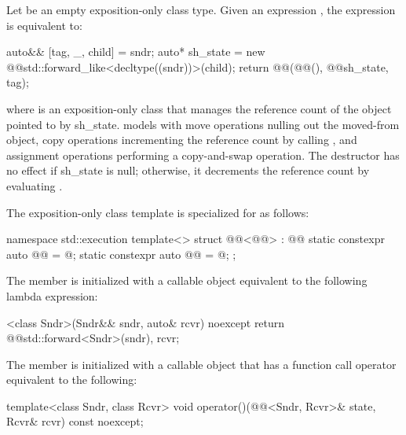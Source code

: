 \pnum
Let  be an empty exposition-only class type.
Given an expression ,
the expression  is equivalent to:
\begin{codeblock}
auto&& [tag, _, child] = sndr;
auto* sh_state = new @@{std::forward_like<decltype((sndr))>(child)};
return @@(@@(), @@{sh_state, tag});
\end{codeblock}
where  is an exposition-only class
that manages the reference count of the  object
pointed to by sh_state.
 models 
with move operations nulling out the moved-from object,
copy operations incrementing the reference count
by calling , and
assignment operations performing a copy-and-swap operation.
The destructor has no effect if sh_state is null;
otherwise, it decrements the reference count
by evaluating .

\pnum
The exposition-only class template 
is specialized for  as follows:
\begin{codeblock}
namespace std::execution {
  template<>
  struct @@<@@> : @@ {
    static constexpr auto @@ = @\seebelow@;
    static constexpr auto @@ = @\seebelow@;
  };
}
\end{codeblock}

\pnum
The member
is initialized with a callable object equivalent to
the following lambda expression:
\begin{codeblock}
[]<class Sndr>(Sndr&& sndr, auto& rcvr) noexcept {
  return @@{std::forward<Sndr>(sndr), rcvr};
}
\end{codeblock}

\pnum
The member
is initialized with a callable object
that has a function call operator equivalent to the following:
\begin{codeblock}
template<class Sndr, class Rcvr>
void operator()(@@<Sndr, Rcvr>& state, Rcvr& rcvr) const noexcept;
\end{codeblock}


